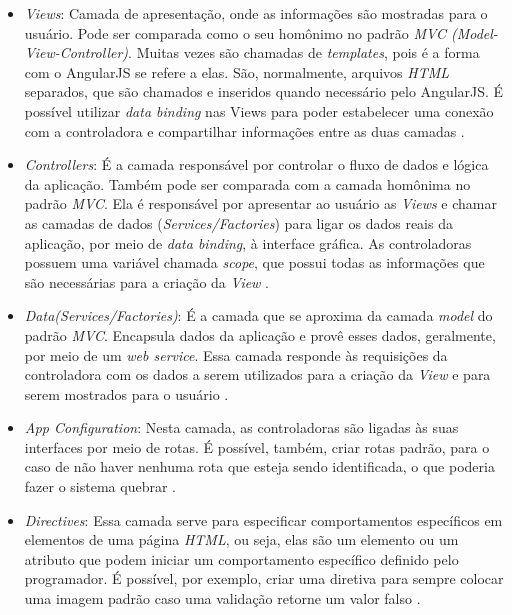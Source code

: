 \begin{itemize}
    \item \textit{Views}: Camada de apresentação, onde as informações são mostradas para o usuário. Pode ser comparada como 
    o seu homônimo no padrão \textit{MVC (Model-View-Controller)}. Muitas vezes são chamadas de \textit{templates}, pois é a forma com o AngularJS 
    se refere a elas. São, normalmente, arquivos \textit{HTML} separados, que são chamados e inseridos quando necessário pelo
    AngularJS. É possível utilizar \textit{data binding} nas Views para poder estabelecer uma conexão com a controladora
    e compartilhar informações entre as duas camadas \cite{drifty_ionic_2016}.
    \item \textit{Controllers}: É a camada responsável por controlar o fluxo de dados e lógica da aplicação. Também pode ser
    comparada com a camada homônima no padrão \textit{MVC}. Ela é responsável por apresentar ao usuário as \textit{Views} e chamar as camadas
    de dados (\textit{Services/Factories}) para ligar os dados reais da aplicação, por meio de \textit{data binding}, à interface
    gráfica. As controladoras possuem uma variável chamada \textit{scope}, que possui todas as informações que são necessárias 
    para a criação da \textit{View} \cite{drifty_ionic_2016}.
    \item \textit{Data(Services/Factories)}: É a camada que se aproxima da camada \textit{model} do padrão \textit{MVC}. Encapsula
    dados da aplicação e provê esses dados, geralmente, por meio de um \textit{web service}. Essa camada responde às requisições
    da controladora com os dados a serem utilizados para a criação da \textit{View} e para serem mostrados para o usuário \cite{drifty_ionic_2016}. 
    \item \textit{App Configuration}: Nesta camada, as controladoras são ligadas às suas interfaces por meio de rotas. É possível,
    também, criar rotas padrão, para o caso de não haver nenhuma rota que esteja sendo identificada, o que poderia fazer o sistema quebrar \cite{drifty_ionic_2016}.
    \item \textit{Directives}: Essa camada serve para especificar comportamentos específicos em elementos de uma página 
    \textit{HTML}, ou seja, elas são um elemento ou um atributo que podem iniciar um comportamento específico definido 
    pelo programador. É possível, por exemplo, criar uma diretiva para sempre colocar uma imagem padrão caso uma validação 
    retorne um valor falso \cite{drifty_ionic_2016}.
\end{itemize}

